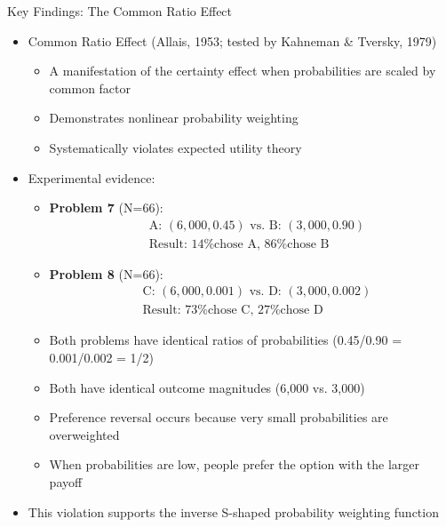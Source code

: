 \documentclass[10pt,handout]{beamer}
\begin{document}
\begin{frame}{Key Findings: The Common Ratio Effect}
  \begin{itemize}[<+->]
    \item Common Ratio Effect (Allais, 1953; tested by Kahneman \& Tversky, 1979)
      \begin{itemize}
        \item A manifestation of the certainty effect when probabilities are scaled by common factor
        \item Demonstrates nonlinear probability weighting
        \item Systematically violates expected utility theory
      \end{itemize}
    \item Experimental evidence:
      \begin{itemize}
        \item \textbf{Problem 7} (N=66):
          \begin{align*}
            &\text{A: } (6,000, 0.45) \text{ vs. B: } (3,000, 0.90)\\
            &\text{Result: 14\% chose A, 86\% chose B}
          \end{align*}
        \item \textbf{Problem 8} (N=66):
          \begin{align*}
            &\text{C: } (6,000, 0.001) \text{ vs. D: } (3,000, 0.002)\\
            &\text{Result: 73\% chose C, 27\% chose D}
          \end{align*}
        \item Both problems have identical ratios of probabilities (0.45/0.90 = 0.001/0.002 = 1/2)
        \item Both have identical outcome magnitudes (6,000 vs. 3,000)
        \item Preference reversal occurs because very small probabilities are overweighted
        \item When probabilities are low, people prefer the option with the larger payoff
      \end{itemize}
    \item This violation supports the inverse S-shaped probability weighting function
  \end{itemize}
\end{frame}
\end{document}
